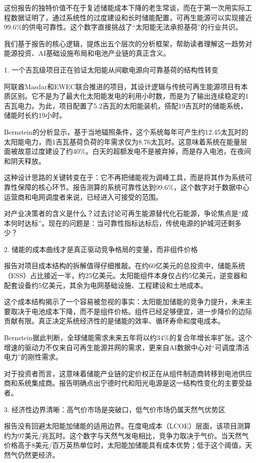 \documentclass[11pt]{ctexart}
\begin{document}
这份报告的独特价值不在于复述储能成本下降的老生常谈，而在于第一次用实际工程数据证明了，通过系统性的过度建设和长时储能配置，可再生能源可以实现接近99.6\%的供电可靠性。这个数字直接挑战了“太阳能无法承担基荷”的行业共识。

我们基于报告的核心逻辑，提炼出五个层次的分析框架，帮助读者理解这一趋势对能源投资、AI基础设施布局和电池产业链的真正含义。

1. 一个吉瓦级项目正在验证太阳能从间歇电源向可靠基荷的结构性转变

阿联酋Masdar和EWEC联合推进的项目，其设计逻辑与传统可再生能源项目有本质区别。它不是为了最大化太阳能发电的利用小时数，而是为了输出连续稳定的1吉瓦电力。为此，项目配置了5.2吉瓦的太阳能装机，搭配19吉瓦时的储能系统，储能时长约19小时。

Bernstein的分析显示，基于当地辐照条件，这个系统每年可产生约12.45太瓦时的太阳能电力，而1吉瓦基荷负荷的年需求仅为8.76太瓦时。这意味着系统在能量层面被故意过度建设了约40\%。白天的超额发电不是被弃掉，而是存入电池，在夜间和阴天释放。

这种设计思路的关键转变在于：它不再把储能视为调峰工具，而是将其作为系统可靠性保障的核心环节。报告测算的系统可靠性达到99.6\%，这个数字对于数据中心运营商和电网调度者来说，已经进入可接受的范围。

对产业决策者的含义是什么？过去讨论可再生能源替代化石能源，争论焦点是“成本何时达标”。现在的问题是：当可靠性指标达标后，传统电源的护城河还剩多少？

2. 储能的成本曲线才是真正驱动竞争格局的变量，而非组件价格

报告对项目成本结构的拆解值得仔细推敲。在约60亿美元的总投资中，储能系统（ESS）占比接近一半，约25亿美元。太阳能组件本身仅占约5亿美元，逆变器和配套设备约5亿美元，其余为电网基础设施、工程建设和土地成本。

这个成本结构揭示了一个容易被忽视的事实：太阳能加储能的竞争力提升，未来主要取决于电池成本下降，而不是组件价格。组件已经足够便宜，进一步降价的边际贡献有限。真正决定系统经济性的是储能的效率、循环寿命和度电成本。

Bernstein据此判断，全球储能需求未来五年将以约34\%的复合年增长率扩张。这个增速的驱动力不仅来自可再生能源并网的需求，更来自AI数据中心对“可调度清洁电力”的刚性需求。

对于投资者而言，这意味着储能产业链的定价权正在从组件制造商转移到电池供应商和系统集成商。报告明确点出宁德时代和阳光电源是这一结构性变化的主要受益者。

3. 经济性边界清晰：高气价市场是突破口，低气价市场仍属天然气优势区

报告没有回避太阳能加储能的适用边界。在度电成本（LCOE）层面，该项目测算约为97美元/兆瓦时。这个数字与天然气发电相比，竞争力取决于气价。当天然气价格高于8美元/百万英热单位时，太阳能加储能具有成本优势；低于这个阈值，天然气仍然更经济。
\end{document}
